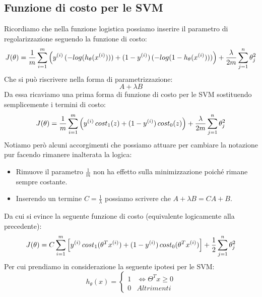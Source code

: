 \subsection{Funzione di costo per le SVM}
Ricordiamo che nella funzione logistica possiamo inserire il parametro di regolarizzazione seguendo la funzione di costo:
\[J(\theta) = {1 \over m} \sum_{i=1}^m \left( y^{(i)}\,(-log(h_\theta(x^{(i)}))) + (1-y^{(i)})\,(-log(1 - h_\theta(x^{(i)}))) \right) + {\lambda \over 2m } \sum_{j=1}^n \theta_j^2\]
Che si può riscrivere nella forma di parametrizzazione:
\[A + \lambda B\]
Da essa ricaviamo una prima forma di funzione di costo per le SVM sostituendo semplicemente i termini di costo:
\[J(\theta) = {1 \over m} \sum_{i=1}^m \left( y^{(i)}\,cost_1(z) + (1-y^{(i)})\,cost_0(z) \right) + {\lambda \over 2m } \sum_{j=1}^n \theta_j^2\]
Notiamo però alcuni accorgimenti che possiamo attuare per cambiare la notazione pur facendo rimanere inalterata la logica:
\begin{itemize}
    \item Rimuove il parametro $\frac{1}{m}$ non ha effetto sulla minimizzazione poiché rimane sempre costante.
    \item Inserendo un termine $C = \frac{1}{\lambda}$ possiamo scrivere che $A + \lambda B = CA+B$.
\end{itemize}
Da cui si evince la seguente funzione di costo (equivalente logicamente alla precedente):
\[J(\theta) = C \sum_{i=1}^m \left[ y^{(i)}\,cost_1(\theta^T x^{(i)}) + (1-y^{(i)})\,cost_0(\theta^T x^{(i)}) \right] + {1 \over 2 } \sum_{j=1}^n \theta_j^2\]
Per cui prendiamo in considerazione la seguente ipotesi per le SVM:
  \[h_\theta(x) =
    \begin{cases}
      1& \iff \Theta^Tx \geq 0 \\
      0& Altrimenti
    \end{cases}
  \]
